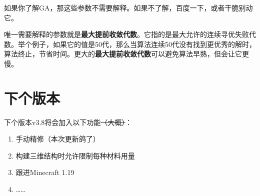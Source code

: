 \documentclass[UTF8]{ctexart}
\begin{document}
如果你了解GA，那这些参数不需要解释。如果不了解，百度一下，或者干脆别动它。

唯一需要解释的参数就是\textbf{最大提前收敛代数}。它指的是最大允许的连续寻优失败代数。举个例子，如果它的值是50代，那么当算法连续50代没有找到更优秀的解时，算法终止，节省时间。更大的\textbf{最大提前收敛代数}可以避免算法早熟，但会让它更慢。

\section{下个版本}
    下个版本v3.8将会加入以下功能\st{（大概）}：
    \begin{enumerate}
        \item 手动精修（本次更新鸽了）
        \item 构建三维结构时允许限制每种材料用量
        \item 跟进Minecraft 1.19
        \item ……
    \end{enumerate}
\end{document}
